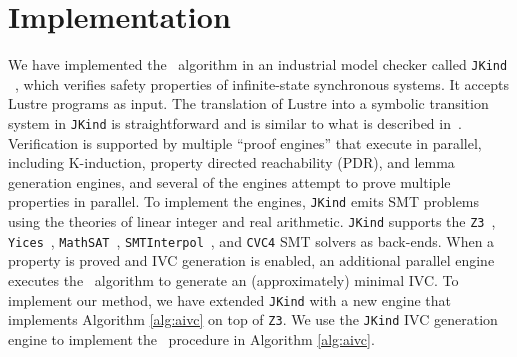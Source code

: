 \section{Implementation}
\label{sec:impl}
We have implemented the \aivcalg ~algorithm
in an industrial model checker called \texttt{JKind} ~\cite{jkind},
which verifies safety properties of  infinite-state synchronous systems.
It accepts Lustre programs \cite{Halbwachs91:lustre} as input.  The translation of Lustre
into a symbolic transition system in \texttt{JKind} is straightforward and is similar to what is described
in~\cite{Hagen08:FMCAD}.
Verification is supported by multiple ``proof engines'' that execute in parallel, including K-induction,  
property directed reachability (PDR), and lemma generation engines, and several of the engines attempt to prove 
multiple properties in parallel.  To implement the engines, 
\texttt{JKind} emits SMT problems using the theories of linear integer and real arithmetic.  \texttt{JKind} supports the 
\texttt{Z3}~\cite{DeMoura08:z3},
\texttt{Yices}~\cite{Dutertre06:yices}, \texttt{MathSAT}~\cite{Cimatti2013:MathSAT},
\texttt{SMTInterpol}~\cite{Christ2012:SMTInterpol}, and \texttt{CVC4} \cite{barrett2011cvc4} SMT solvers as back-ends.  When a property is
proved and IVC generation is enabled, an additional parallel engine
executes the \ucalg ~algorithm \cite{Ghass16} to generate an (approximately) minimal IVC.  
%
To implement our method, we have extended \texttt{JKind} with a new engine that
implements Algorithm \ref{alg:aivc} on top of \texttt{Z3}.
We use the \texttt{JKind} IVC generation engine to implement the \getivc\ procedure in  Algorithm \ref{alg:aivc}. 

